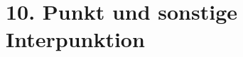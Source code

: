 \documentclass[handout,aspectratio=1610,dvipsnames]{beamer}
\begin{document}
  \section[Punkt]{10. Punkt und sonstige Interpunktion}
  \let\woopsi\section\let\section\subsection\let\subsection\subsubsection
  
  \let\subsection\section\let\section\woopsi
\end{document}
